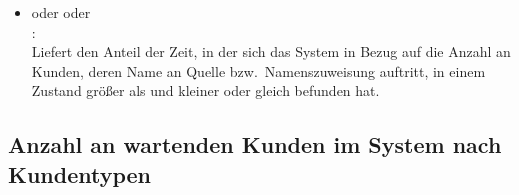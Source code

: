 \begin{itemize}
\item
{} oder  oder\\
:\\
Liefert den Anteil der Zeit, in der sich das System in Bezug auf die Anzahl an Kunden, deren Name an Quelle bzw.\ Namenszuweisung  auftritt, in einem Zustand größer als  und kleiner oder gleich  befunden hat.

\end{itemize}



\subsection{Anzahl an wartenden Kunden im System nach Kundentypen}

